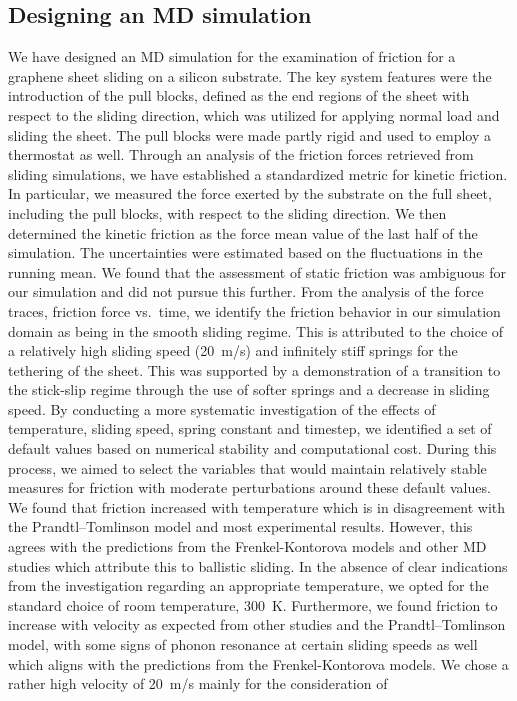 \subsection{Designing an MD simulation}
We have designed an \acrshort{MD} simulation for the examination of friction for
a graphene sheet sliding on a silicon substrate. The key system features were
the introduction of the pull blocks, defined as the end regions of the sheet
with respect to the sliding direction, which was utilized for applying normal
load and sliding the sheet. The pull blocks were made partly rigid and used to
employ a thermostat as well. Through an analysis of the friction forces retrieved from sliding simulations, we have established a standardized metric for kinetic friction. In particular, we measured the force exerted by the substrate on the full sheet, including the pull blocks, with respect to the sliding direction. We then determined the kinetic friction as the force mean value of the last half of the simulation. The uncertainties were estimated based on the fluctuations in the running mean. We found that the assessment of static friction was ambiguous for our simulation and did not pursue this further. From the analysis of the
force traces, friction force vs.\ time, we identify the friction behavior in our
simulation domain as being in the smooth sliding regime. This is attributed to the choice of a relatively high sliding speed (\SI{20}{m/s}) and infinitely stiff springs for the tethering of the sheet. This was supported by a demonstration of a transition to the stick-slip regime through the use of softer springs and a decrease in sliding speed. By conducting a more systematic investigation of the
effects of temperature, sliding speed, spring constant and timestep, we identified a set of default values based on numerical stability and computational cost. During this process, we aimed to select the variables that would maintain relatively stable measures for friction with moderate perturbations around these default values. We found that friction increased with temperature which is in disagreement with the Prandtl–Tomlinson model and most experimental results. However, this agrees with the predictions from the Frenkel-Kontorova models and other \acrshort{MD} studies which attribute this to ballistic sliding. In the absence of clear indications from the investigation regarding an appropriate temperature, we opted for the standard choice of room temperature, \SI{300}{K}. Furthermore, we found friction to increase with velocity as
expected from other studies and the Prandtl–Tomlinson model, with some signs of phonon resonance at certain sliding speeds as well which aligns with the predictions from the Frenkel-Kontorova models. We chose a rather high velocity of \SI{20}{m/s} mainly for the consideration of
